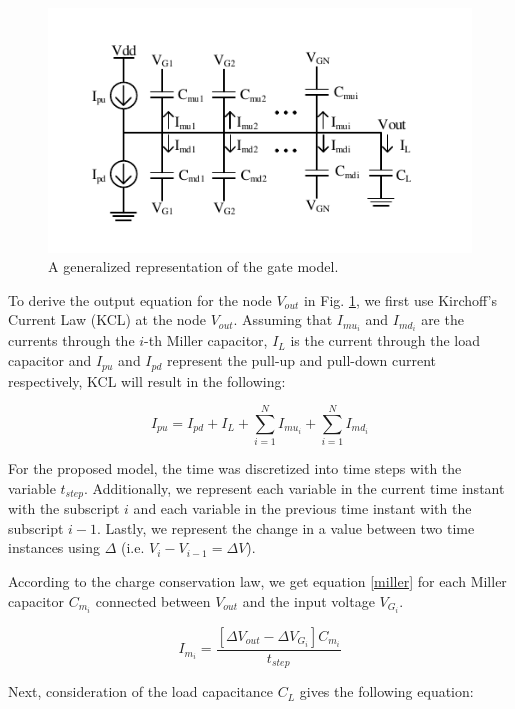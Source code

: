 \begin{figure}[!htbp]
	\centering
	\includegraphics[width=0.75\linewidth]{Figures/GenModel}
	\caption{A generalized representation of the gate model.}
	\label{Gmod}
\end{figure}

To derive the output equation for the node $V_{out}$ in Fig. \ref{Gmod}, we first use Kirchoff’s Current Law (KCL) at the node $V_{out}$. Assuming that $I_{mu_i}$ and $I_{md_i}$ are the currents through the $i$-th Miller capacitor, $I_L$ is the current through the load capacitor and $I_{pu}$ and $I_{pd}$ represent the pull-up and pull-down current respectively, KCL will result in the following:

\begin{equation}\label{KCL}
I_{pu} = I_{pd} + I_L + \sum_{i=1}^{N}I_{mu_i} + \sum_{i=1}^{N}I_{md_i}
\end{equation}

For the proposed model, the time was discretized into time steps with the variable $t_{step}$. Additionally, we represent each variable in the current time instant with the subscript $i$ and each variable in the previous time instant with the subscript $i-1$. Lastly, we represent the change in a value between two time instances using $\Delta$ (i.e. $V_i-V_{i-1}=\Delta V$). 

According to the charge conservation law, we get equation \ref{miller} for each Miller capacitor $C_{m_i}$ connected between $V_{out}$ and the input voltage $V_{G_i}$.

\begin{equation}\label{miller}
I_{m_i} = \frac{[\Delta V_{out} - \Delta V_{G_i}]C_{m_i}}{t_{step}}
\end{equation}

Next, consideration of the load capacitance $C_L$ gives the following equation:

